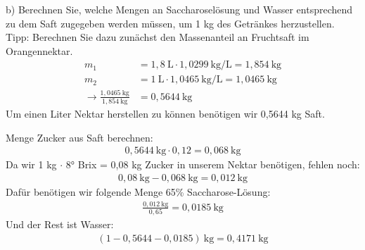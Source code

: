 \documentclass[a4paper,10pt]{article}
\begin{document}
\pp
b) Berechnen Sie, welche Mengen an Saccharoselösung und Wasser entsprechend zu dem
Saft zugegeben werden müssen, um 1 kg des Getränkes herzustellen. Tipp: Berechnen Sie
dazu zunächst den Massenanteil an Fruchtsaft im Orangennektar.
\begin{align*}
m_1 &= 1,8 ~\text{L} \cdot 1,0299 ~\text{kg/L} = 1,854 ~\text{kg} \\
m_2 &= 1 ~\text{L} \cdot 1,0465 ~\text{kg/L} = 1,0465 ~\text{kg} \\ 
\rightarrow \frac{1,0465 ~\text{kg}}{1,854 ~\text{kg}} &=  0,5644 ~\text{kg}
\end{align*}
Um einen Liter Nektar herstellen zu können benötigen wir 0,5644 kg Saft. \par 
Menge Zucker aus Saft berechnen:
\begin{align*}
0,5644 ~\text{kg} \cdot 0,12 = 0,068 ~\text{kg}
\end{align*}
Da wir 1 kg $\cdot $ 8° Brix = 0,08 kg Zucker in unserem Nektar benötigen, fehlen noch:
\begin{align*}
0,08~\text{kg} - 0,068~\text{kg} = 0,012 ~\text{kg}
\end{align*}
Dafür benötigen wir folgende Menge 65\% Saccharose-Lösung:
\begin{align*}
\frac{0,012~\text{kg}}{0,65} = 0,0185 ~\text{kg}
\end{align*}
Und der Rest ist Wasser:
\begin{align*}
(1-0,5644-0,0185)~\text{kg} = 0,4171 ~\text{kg}
\end{align*}
\end{document}
